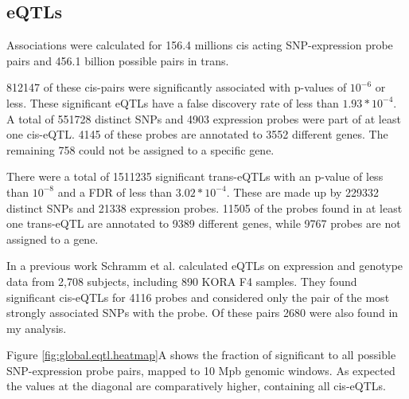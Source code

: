 \documentclass[a4paper,12pt,twoside,openright]{article}
\begin{document}

\subsection{eQTLs}
\label{Results:eQTLs}
Associations were calculated for 156.4 millions cis acting SNP-expression probe pairs and 456.1 billion possible pairs in trans. 

812147 of these cis-pairs were significantly associated with p-values of $10^{-6}$ or less. These significant eQTLs have a false discovery rate of less than $1.93*10^{-4}$. A total of 551728 distinct SNPs and 4903 expression probes were part of at least one cis-eQTL. 4145 of these probes are annotated to 3552 different genes. The remaining 
758 could not be assigned to a specific gene.

There were a total of 1511235 significant trans-eQTLs with an p-value of less than $10^{-8}$ and a FDR of less than $3.02*10^{-4}$. These are made up by 229332 distinct SNPs and 21338 expression probes. 11505 of the probes found in at least one trans-eQTL are annotated to 9389 different genes, while 9767 probes are not assigned to a gene.

In a previous work Schramm et al. \cite{Schramm2014} calculated eQTLs on expression and genotype data from 2,708 subjects, including 890 KORA F4 samples. They found significant cis-eQTLs for 4116 probes and considered only the pair of the most strongly associated SNPs with the probe. Of these pairs 2680 were also found in my analysis. 

Figure \ref{fig:global.eqtl.heatmap}A shows the fraction of significant to all possible  SNP-expression probe pairs, mapped to 10 Mpb genomic windows. As expected the values at the diagonal are comparatively higher, containing all cis-eQTLs. 
\end{document}
